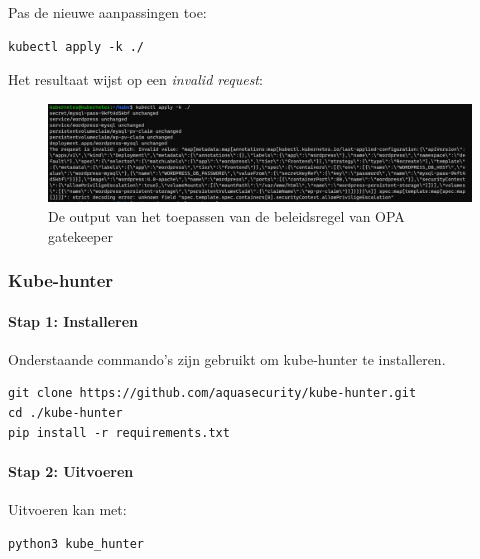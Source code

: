 Pas de nieuwe aanpassingen toe:
\begin{lstlisting}[language=tex, caption={Wijzigingen aanbrengen}]
kubectl apply -k ./
\end{lstlisting}

Het resultaat wijst op een \textit{invalid request}:
\begin{flushleft}
    \begin{figure}[h]
        \includegraphics[width=.95\textwidth]{graphics/invalidRequest.png}
        \caption{\label{fig:invalidRequest}De output van het toepassen van de beleidsregel van OPA gatekeeper}
    \end{figure} 
\end{flushleft}

\subsubsection{Kube-hunter}

\paragraph{Stap 1: Installeren}
Onderstaande commando's zijn gebruikt om kube-hunter te installeren.
\begin{lstlisting}[language=tex, caption={Kube-hunter installeren}]
git clone https://github.com/aquasecurity/kube-hunter.git
cd ./kube-hunter
pip install -r requirements.txt
\end{lstlisting}

\paragraph{Stap 2: Uitvoeren}
Uitvoeren kan met: 
\begin{lstlisting}[language=tex, caption={kube-hunter uitvoeren}]
    python3 kube_hunter
\end{lstlisting}

